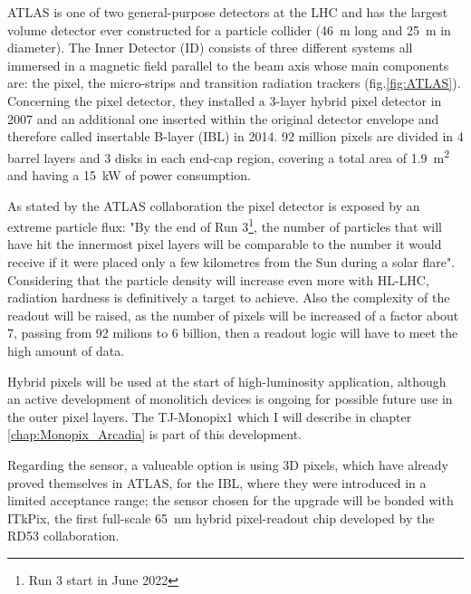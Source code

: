         ATLAS is one of two general-purpose detectors at the LHC and has the largest volume detector ever constructed for a particle collider (\SI{46}{m} long and \SI{25}{m} in diameter).  
        The Inner Detector (ID) consists of three different systems all immersed in a magnetic field parallel to the beam axis whose main components are: the pixel, the micro-strips and transition radiation trackers (fig.\ref{fig:ATLAS}). 
        Concerning the pixel detector, they installed a 3-layer hybrid pixel detector in 2007 and an additional one inserted within the original detector envelope and therefore called insertable B-layer (IBL) in 2014.
        92 million pixels are divided in 4 barrel layers and 3 disks in each end-cap region, covering a total area of \SI{1.9}{m\squared} and having a \SI{15}{kW} of power consumption. 

        As stated by the ATLAS collaboration the pixel detector is exposed by an extreme particle flux: "By the end of Run 3\footnote{Run 3 start in June 2022}, the number of particles that will have hit the innermost pixel layers will be comparable to the number it would receive if it were placed only a few kilometres from the Sun during a solar flare". Considering that the particle density will increase even more with HL-LHC, radiation hardness is definitively a target to achieve. 
        Also the complexity of the readout will be raised, as the number of pixels will be increased of a factor about 7, passing from 92 milions to 6 billion, then a readout logic will have to meet the high amount of data. 

        Hybrid pixels will be used at the start of high-luminosity application, although an active development of monolitich devices is ongoing for possible future use in the outer pixel layers. The TJ-Monopix1 which I will describe in chapter \ref{chap:Monopix_Arcadia} is part of this development. 
       
        Regarding the sensor, a valueable option is using 3D pixels, which have already proved themselves in ATLAS, for the IBL, where they were introduced in a limited acceptance range; the sensor chosen for the upgrade will be bonded with ITkPix, the first full-scale \SI{65}{nm} hybrid pixel-readout chip developed by the RD53 collaboration.


